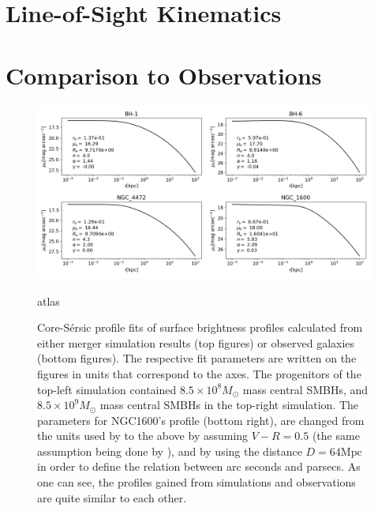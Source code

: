 \documentclass[english, oneside]{HYgradu}
\begin{document}
\section{Line-of-Sight Kinematics}

\section{Comparison to Observations}

\begin{figure}[h]
	\centering
	\includegraphics[width=\textwidth]{core_sersic_fits_obs_and_sim.png}
	\caption{Core-Sérsic profile fits of surface brightness profiles calculated from either merger simulation results (top figures) or observed galaxies (bottom figures). The respective fit parameters are written on the figures in units that correspond to the axes. The progenitors of the top-left simulation contained $8.5 \times 10^8 M_\odot$ mass central SMBHs, and $8.5 \times 10^9 M_\odot$ mass central SMBHs in the top-right simulation. The parameters for NGC1600's profile (bottom right), are changed from the units used by \cite{Thomas2016} to the above by assuming $V - R = 0.5$ (the same assumption being done by \cite{Lauer2007}), and by using the distance $D = 64 \mathrm{Mpc}$ \citep{Thomas2016} in order to define the relation between arc seconds and parsecs. As one can see, the profiles gained from simulations and observations are quite similar to each other.}atlas
\end{figure}
\end{document}
